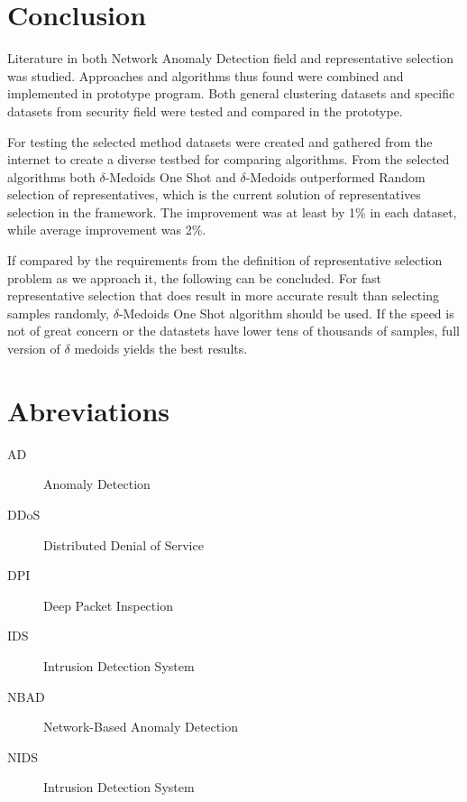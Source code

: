 \documentclass[thesis=B,english]{FITthesis}[2012/10/20]
\begin{document}
\chapter{Conclusion}
Literature in both Network Anomaly Detection field and representative selection was studied.
Approaches and algorithms thus found were combined and implemented in prototype program.
Both general clustering datasets and specific datasets from security field were tested and compared in the prototype.

For testing the selected method datasets were created and gathered from the internet to create a diverse testbed for comparing algorithms.
From the selected algorithms both $\delta$-Medoids One Shot and $\delta$-Medoids outperformed Random selection of representatives, which is the current solution of representatives selection in the framework.
The improvement was at least by 1\% in each dataset, while average improvement was 2\%. 


If compared by the requirements from the definition of representative selection problem as we approach it, the following can be concluded.
For fast representative selection that does result in more accurate result than selecting samples randomly, $\delta$-Medoids One Shot algorithm should be used.
If the speed is not of great concern or the datastets have lower tens of thousands of samples, full version of $\delta$ medoids yields the best results.




\appendix

\chapter{Abreviations}
\begin{description}
    \item[AD] Anomaly Detection
    \item[DDoS] Distributed Denial of Service
    \item[DPI] Deep Packet Inspection
    \item[IDS] Intrusion Detection System
	\item[NBAD] Network-Based Anomaly Detection
	\item[NIDS] Intrusion Detection System
\end{description}
\end{document}
